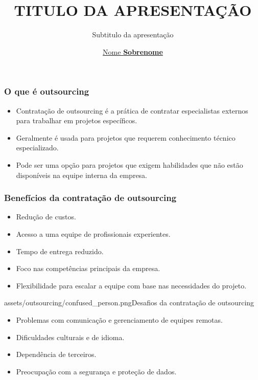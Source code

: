 \documentclass{beamer}
\title{TITULO DA APRESENTAÇÃO}
\subtitle{Subtitulo da apresentação}
\author{\href{mailto:<user-mail@ifsp.edu.br>}{Nome \textbf{Sobrenome}}}
\begin{document}
\maketitle

\begin{frame}


\frametitle{O que é outsourcing}

\begin{itemize}
\item Contratação de outsourcing é a prática de contratar especialistas externos para trabalhar em projetos específicos.
\item Geralmente é usada para projetos que requerem conhecimento técnico especializado.
\item Pode ser uma opção para projetos que exigem habilidades que não estão disponíveis na equipe interna da empresa.
\end{itemize}


\end{frame}


\begin{frame}

\frametitle{Benefícios da contratação de outsourcing}

\begin{itemize}
\item Redução de custos.
\item Acesso a uma equipe de profissionais experientes.
\item Tempo de entrega reduzido.
\item Foco nas competências principais da empresa.
\item Flexibilidade para escalar a equipe com base nas necessidades do projeto.
\end{itemize}


\end{frame}







\begin{sidepic}{assets/outsourcing/confused_person.png}{Desafios da contratação de outsourcing}
    \begin{itemize}
    \item Problemas com comunicação e gerenciamento de equipes remotas.
    \item Dificuldades culturais e de idioma.
    \item Dependência de terceiros.
    \item Preocupação com a segurança e proteção de dados.
    \end{itemize}
\end{sidepic}
\end{document}
